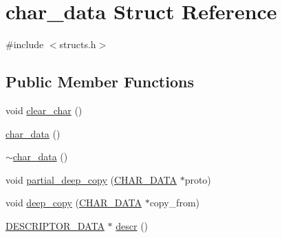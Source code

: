 \hypertarget{structchar__data}{\section{char\-\_\-data Struct Reference}
\label{structchar__data}
}


{\ttfamily \#include $<$structs.\-h$>$}

\subsection*{Public Member Functions}
\begin{DoxyCompactItemize}
\item 
void \hyperlink{structchar__data_af8247fa1cac183f1ba2c5ebb938905f9}{clear\-\_\-char} ()
\item 
\hyperlink{structchar__data_a7f630fec816284cd12ab3244e7ceb53d}{char\-\_\-data} ()
\item 
\hyperlink{structchar__data_a2368cbfbf3cf49abb90e1bb67f0fab6d}{$\sim$char\-\_\-data} ()
\item 
void \hyperlink{structchar__data_a7e45c8966417517e72a215319c80e057}{partial\-\_\-deep\-\_\-copy} (\hyperlink{structs_8h_af33ed1e66e8541a08bed257124f50f31}{C\-H\-A\-R\-\_\-\-D\-A\-T\-A} $\ast$proto)
\item 
void \hyperlink{structchar__data_a214c263f8968e2b43825af6d08cb7102}{deep\-\_\-copy} (\hyperlink{structs_8h_af33ed1e66e8541a08bed257124f50f31}{C\-H\-A\-R\-\_\-\-D\-A\-T\-A} $\ast$copy\-\_\-from)
\item 
\hyperlink{net__link_8h_adaf40e7c4f580ba35192c957078f5771}{D\-E\-S\-C\-R\-I\-P\-T\-O\-R\-\_\-\-D\-A\-T\-A} $\ast$ \hyperlink{structchar__data_aa7058dc7647d018af6abf75cef3b8e58}{descr} ()
\end{DoxyCompactItemize}
